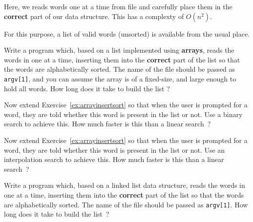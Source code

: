 
Here, we reads words one at a time
from file and carefully place them in the {\bf correct} part of
our data structure. This has a complexty of $O(n^2)$.

For this purpose, a list of valid words (unsorted) is available
from the usual place.

\begin{exercise}
\label{ex:arrayinsertsort}
Write a program which, based on a
list implemented using {\bf arrays}, reads the words in
one at a time, inserting them into the {\bf correct} part of the list
so that the words are alphabetically sorted.
The name of the file should be passed as \verb^argv[1]^,
and you can assume the array is of a fixed-size,
and large enough to hold all words.
How long does it take to build the list ?
\end{exercise}

\begin{exercise}
Now extend Exercise~\ref{ex:arrayinsertsort}
so that when the user is prompted for a word,
they are told whether this word is present in the list or not.
Use a binary search to achieve this.
How much faster is this than a linear search~?
\end{exercise}

\begin{exercise}
Now extend Exercise~\ref{ex:arrayinsertsort}
so that when the user is prompted for a word,
they are told whether this word is present in the list or not.
Use an interpolation search to achieve this.
How much faster is this than a linear search~?
\end{exercise}

\begin{exercise}
Write a program which, based on a
linked list data structure, reads the words in
one at a time, inserting them into the {\bf correct} part of the list
so that the words are alphabetically sorted.
The name of the file should be passed as \verb^argv[1]^.
How long does it take to build the list~?
\end{exercise}

